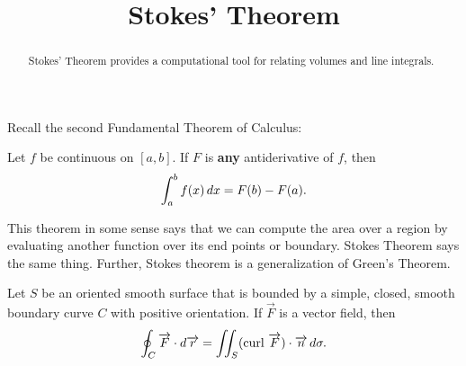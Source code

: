 \documentclass{ximera}
\title[Dig-In:]{Stokes' Theorem}
\begin{document}
\begin{abstract}
Stokes' Theorem provides a computational tool for relating volumes and line integrals.
\end{abstract}
\maketitle

Recall the second Fundamental Theorem of Calculus:

\begin{theorem}
  Let $f$ be continuous on $[a,b]$. If $F$ is \textbf{any}
  antiderivative of $f$, then
  \[
  \int_a^b f(x)\mathop{}\!d x = F(b)-F(a).
  \]
\end{theorem}

This theorem in some sense says that we can compute the area over a region by evaluating another function over its end points or boundary. Stokes Theorem says the same thing. Further, Stokes theorem is a generalization of Green's Theorem.


\begin{theorem}
  Let $S$ be an oriented smooth surface that is bounded by a simple, closed, smooth boundary curve $C$ with positive orientation. If $\overrightarrow{F}$ is a vector field, then
  \[
  \oint_C \overrightarrow{F} \cdot \mathop{}\!d \overrightarrow{r} = \iint_S (\text{curl }\overrightarrow{F}) \cdot \overrightarrow{n} \mathop{}\!d \sigma.
  \]
\end{theorem}
\end{document}
